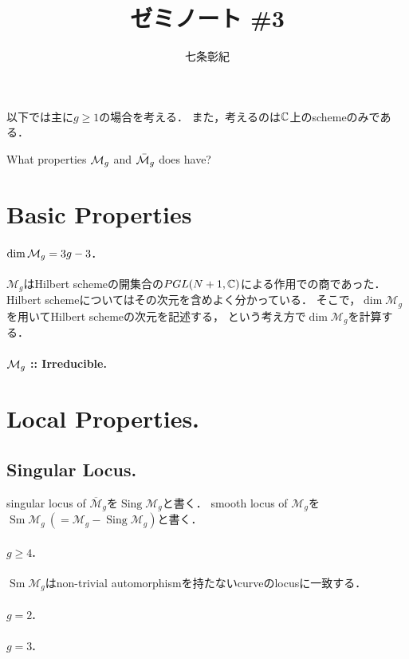 \documentclass[a4paper]{jsarticle}
\newcommand{\M}{\mathcal{M}}
\newcommand{\barM}{\overline{\mathcal{M}}}
\newcommand{\Sing}{\operatorname{Sing}}
\newcommand{\Sm}{\operatorname{Sm}}
\begin{document}
\title{ゼミノート \#3}
\author{七条彰紀}
\maketitle

以下では主に$g \geq 1$の場合を考える．
また，考えるのは$\mathbb{C}$上のschemeのみである．

\begin{problem}
    What properties $\mathcal{M}_g$ and $\bar{\mathcal{M}}_g$ does have?
\end{problem}

\section{Basic Properties}
    \paragraph{$\dim \mathcal{M}_g=3g-3$.}
    $\M_g$はHilbert schemeの開集合の$PGL(N+1, \mathbb{C})$による作用での商であった．
    Hilbert schemeについてはその次元を含めよく分かっている．
    そこで，$\dim \M_g$を用いてHilbert schemeの次元を記述する，
    という考え方で$\dim \M_g$を計算する．

    \paragraph{$\mathcal{M}_g$ :: Irreducible.}
    

\section{Local Properties.}
    \subsection{Singular Locus.}
        singular locus of $\barM_g$を$\Sing \M_g$と書く．
        smooth locus of $\M_g$を$\Sm \M_g \ (=\M_g-\Sing \M_g)$と書く．
        \paragraph{$g \geq 4$.}
            $\Sm \M_g$はnon-trivial automorphismを持たないcurveのlocusに一致する．

        \paragraph{$g=2$.}
        
        \paragraph{$g=3$.}
\end{document}
